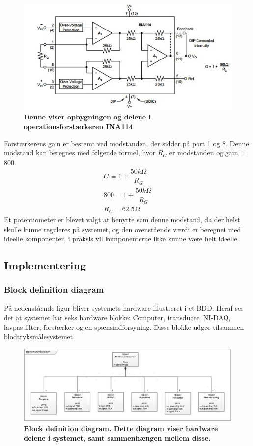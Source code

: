 \begin{figure}[H]
\includegraphics[width =1.0\textwidth , center]{billeder/forstarker}
\caption{\textbf{Denne viser opbygningen og delene i operationsforstærkeren INA114}}
\end{figure}
Forstærkerens gain er bestemt ved modstanden, der sidder på port 1 og 8. Denne modstand kan beregnes med følgende formel, hvor $R_G$ er modstanden og gain = 800.
\begin{align}
G=1+\dfrac{50k\Omega}{R_G}\\
800 = 1+\dfrac{50k\Omega}{R_G}\\
R_G=62.5\Omega
\end{align}
Et potentiometer er blevet valgt at benytte som denne modstand, da der helst skulle kunne reguleres på systemet, og den ovenstående værdi er beregnet med ideelle komponenter, i praksis vil komponenterne ikke kunne være helt ideelle.
\subsection{Implementering}
\subsubsection{Block definition diagram}
På nedenstående figur bliver systemets hardware illustreret i et BDD. Heraf ses det at systemet har seks hardware blokke: Computer, transducer, NI-DAQ, lavpas filter, forstærker og en spænsindforsyning. Disse blokke udgør tilsammen blodtryksmålesystemet.
\begin{figure}[H]
\includegraphics[width =1.0\textwidth , center]{billeder/BDD}
\caption{\textbf{Block definition diagram. Dette diagram viser hardware delene i systemet, samt sammenhængen mellem disse.}}
\end{figure}
